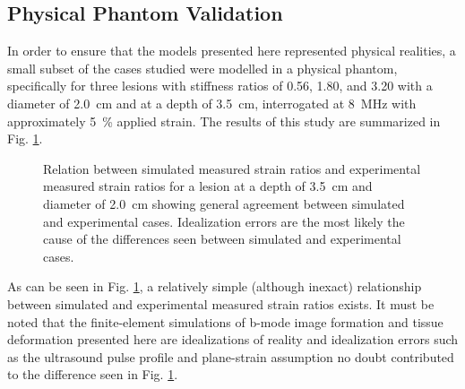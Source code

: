 		\subsection{Physical Phantom Validation}
			In order to ensure that the models presented here represented physical realities, a small subset of the cases studied were modelled in a physical phantom, specifically for three lesions with stiffness ratios of 0.56, 1.80, and 3.20 with a diameter of \SI{2.0}{cm} and at a depth of \SI{3.5}{cm}, interrogated at \SI{8}{MHz} with approximately \SI{5}{\percent} applied strain. The results of this study are summarized in Fig. \ref{fig:phantom_validation}.

			\begin{figure}[!t]
				\centering
				\caption[Experimental validation]{Relation between simulated measured strain ratios and experimental measured strain ratios for a lesion at a depth of \SI{3.5}{cm} and diameter of \SI{2.0}{cm} showing general agreement between simulated and experimental cases. Idealization errors are the most likely the cause of the differences seen between simulated and experimental cases.}
				\label{fig:phantom_validation}
			\end{figure}

			As can be seen in Fig. \ref{fig:phantom_validation}, a relatively simple (although inexact) relationship between simulated and experimental measured strain ratios exists. It must be noted that the finite-element simulations of b-mode image formation and tissue deformation presented here are idealizations of reality and idealization errors such as the ultrasound pulse profile and plane-strain assumption no doubt contributed to the difference seen in Fig. \ref{fig:phantom_validation}.

